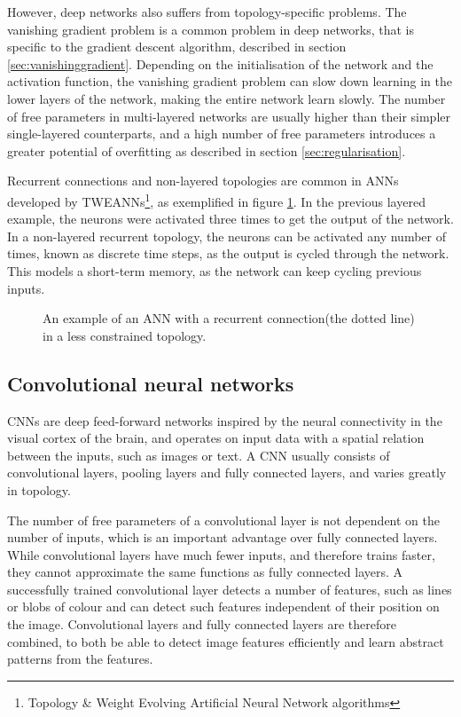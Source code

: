 However, deep networks also suffers from topology-specific problems. The vanishing gradient problem is a common problem in deep networks, that is specific to the gradient descent algorithm, described in section \ref{sec:vanishinggradient}. Depending on the initialisation of the network and the activation function, the vanishing gradient problem can slow down learning in the lower layers of the network, making the entire network learn slowly. The number of free parameters in multi-layered networks are usually higher than their simpler single-layered counterparts, and a high number of free parameters introduces a greater potential of overfitting as described in section \ref{sec:regularisation}.

Recurrent connections and non-layered topologies are common in ANNs developed by TWEANNs\footnote{Topology \& Weight Evolving Artificial Neural Network algorithms}, as exemplified in figure \ref{fig:rt}. In the previous layered example, the neurons were activated three times to get the output of the network. In a non-layered recurrent topology, the neurons can be activated any number of times, known as discrete time steps, as the output is cycled through the network. This models a short-term memory, as the network can keep cycling previous inputs.

\begin{figure}[H]
	\vspace{-1.2cm}
    \centering
    
    \caption[Simple recurrent topology]{An example of an ANN with a recurrent connection(the dotted line) in a less constrained topology.}
    \label{fig:rt}
\end{figure}

\subsection{Convolutional neural networks}
CNNs are deep feed-forward networks inspired by the neural connectivity in the visual cortex of the brain, and operates on input data with a spatial relation between the inputs, such as images or text.
A CNN usually consists of convolutional layers, pooling layers and fully connected layers, and varies greatly in topology.

The number of free parameters of a convolutional layer is not dependent on the number of inputs, which is an important advantage over fully connected layers. While convolutional layers have much fewer inputs, and therefore trains faster, they cannot approximate the same functions as fully connected layers. A successfully trained convolutional layer detects a number of features, such as lines or blobs of colour and can detect such features independent of their position on the image. Convolutional layers and fully connected layers are therefore combined, to both be able to detect image features efficiently and learn abstract patterns from the features.

